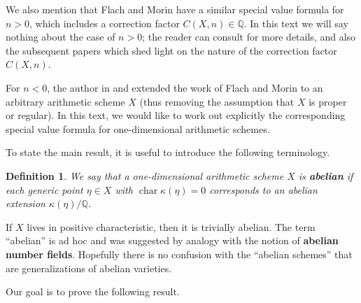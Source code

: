 \documentclass[draft]{article}
\DeclareMathOperator{\fchar}{char}
\newcommand{\QQ}{\mathbb{Q}}
\theoremstyle{myplain}
\theoremstyle{mydefinition}
\newtheorem{definition}[theorem]{Definition}
\begin{document}
We also mention that Flach and Morin have a similar special value formula for
$n > 0$, which includes a correction factor $C (X,n) \in \QQ$. In this text we
will say nothing about the case of $n > 0$; the reader can consult
\cite{Flach-Morin-2018} for more details, and also the subsequent papers
\cite{Flach-Morin-2020,Flach-Morin-2020-Muenster,Morin-2021-THH} which shed
light on the nature of the correction factor $C (X,n)$.

For $n < 0$, the author in \cite{Beshenov-Weil-etale-1} and
\cite{Beshenov-Weil-etale-2} extended the work of Flach and Morin
\cite{Flach-Morin-2018} to an arbitrary arithmetic scheme $X$ (thus removing the
assumption that $X$ is proper or regular). In this text, we would like to work
out explicitly the corresponding special value formula for one-dimensional
arithmetic schemes.

\vspace{1em}

To state the main result, it is useful to introduce the following terminology.

\begin{definition}
  \label{dfn:abelian-scheme}
  We say that a one-dimensional arithmetic scheme $X$ is \textbf{abelian} if
  each generic point $\eta \in X$ with $\fchar \kappa (\eta) = 0$ corresponds to
  an abelian extension $\kappa (\eta)/\QQ$.
\end{definition}

If $X$ lives in positive characteristic, then it is trivially abelian.
The term ``abelian'' is ad hoc and was suggested by analogy with the notion of
\textbf{abelian number fields}. Hopefully there is no confusion with the
``abelian schemes'' that are generalizations of abelian varieties.

\pagebreak

Our goal is to prove the following result.
\end{document}
